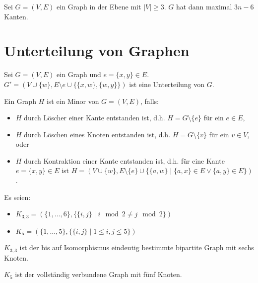 \begin{corollary}
    \label{cor:max-edges}
    Sei $ G = (V, E) $ ein Graph in der Ebene mit $ |V| \geq 3 $.
    $ G $ hat dann maximal $ 3n - 6 $ Kanten.
\end{corollary}

\section{Unterteilung von Graphen}

\begin{definition}[Unterteilung]
    Sei $ G = (V, E) $ ein Graph und $ e = \{ x, y \} \in E $.
    $ G' = (V \cup \{ w \}, E \setminus e \cup \{ \{ x, w \}, \{ w, y \} \}) $ ist eine Unterteilung von $ G $.
\end{definition}

\begin{definition}
    Ein Graph $ H $ ist ein Minor von $ G = (V, E) $, falls:
    \begin{itemize}
        \item $ H $ durch Löscher einer Kante entstanden ist, d.h. $ H = G \setminus \{ e \} $ für ein $ e \in E $,
        \item $ H $ durch Löschen eines Knoten entstanden ist, d.h. $ H = G \setminus \{ v \} $ für ein $ v \in V $, oder
        \item $ H $ durch Kontraktion einer Kante entstanden ist, d.h. für eine Kante $ e = \{ x, y \} \in E $ ist $ H = (V \cup \{ w \}, E \setminus \{ e \} \cup \{ \{ a, w \} \mid \{ a, x \} \in E \lor \{ a, y \} \in E \}) $.
    \end{itemize}
\end{definition}

\begin{definition}
    Es seien:
    \begin{itemize}
        \item $ K_{3,3} = (\{ 1, \dots, 6 \}, \{ \{ i, j \} \mid i \mod 2 \ne j \mod 2 \})$
        \item $ K_5 = (\{ 1, \dots, 5 \}, \{ \{ i, j \} \mid 1 \leq i, j \leq 5 \}) $
    \end{itemize}
\end{definition}

\begin{remark}
    $ K_{3,3} $ ist der bis auf Isomorphismus eindeutig bestimmte bipartite Graph mit sechs Knoten.

    $ K_5 $ ist der vollständig verbundene Graph mit fünf Knoten.
\end{remark}

